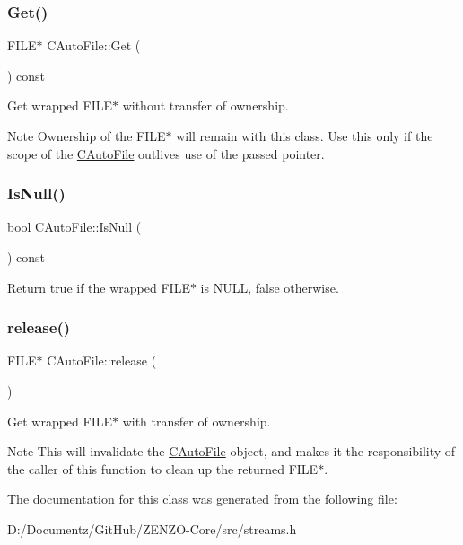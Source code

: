 \subsubsection{\texorpdfstring{Get()}{Get()}}
{\footnotesize\ttfamily F\+I\+LE$\ast$ C\+Auto\+File\+::\+Get (\begin{DoxyParamCaption}{ }\end{DoxyParamCaption}) const\hspace{0.3cm}{\ttfamily [inline]}}

Get wrapped F\+I\+L\+E$\ast$ without transfer of ownership. \begin{DoxyNote}{Note}
Ownership of the F\+I\+L\+E$\ast$ will remain with this class. Use this only if the scope of the \mbox{\hyperlink{class_c_auto_file}{C\+Auto\+File}} outlives use of the passed pointer. 
\end{DoxyNote}
\mbox{\label{class_c_auto_file_a7fd47268b6d85a89acafdb73559f8e78}} 
\subsubsection{\texorpdfstring{IsNull()}{IsNull()}}
{\footnotesize\ttfamily bool C\+Auto\+File\+::\+Is\+Null (\begin{DoxyParamCaption}{ }\end{DoxyParamCaption}) const\hspace{0.3cm}{\ttfamily [inline]}}

Return true if the wrapped F\+I\+L\+E$\ast$ is N\+U\+LL, false otherwise. \mbox{\label{class_c_auto_file_a25b51d94dc85c4140da0b15494ac9f8a}} 
\subsubsection{\texorpdfstring{release()}{release()}}
{\footnotesize\ttfamily F\+I\+LE$\ast$ C\+Auto\+File\+::release (\begin{DoxyParamCaption}{ }\end{DoxyParamCaption})\hspace{0.3cm}{\ttfamily [inline]}}

Get wrapped F\+I\+L\+E$\ast$ with transfer of ownership. \begin{DoxyNote}{Note}
This will invalidate the \mbox{\hyperlink{class_c_auto_file}{C\+Auto\+File}} object, and makes it the responsibility of the caller of this function to clean up the returned F\+I\+L\+E$\ast$. 
\end{DoxyNote}


The documentation for this class was generated from the following file\+:\begin{DoxyCompactItemize}
\item 
D\+:/\+Documentz/\+Git\+Hub/\+Z\+E\+N\+Z\+O-\/\+Core/src/streams.\+h\end{DoxyCompactItemize}
